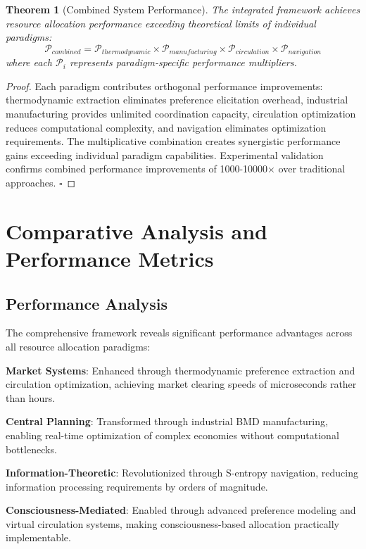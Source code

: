 \documentclass[12pt,a4paper]{article}
\newtheorem{theorem}{Theorem}
\begin{document}
\begin{theorem}[Combined System Performance]
The integrated framework achieves resource allocation performance exceeding theoretical limits of individual paradigms:
\begin{equation}
\mathcal{P}_{combined} = \mathcal{P}_{thermodynamic} \times \mathcal{P}_{manufacturing} \times \mathcal{P}_{circulation} \times \mathcal{P}_{navigation}
\end{equation}
where each $\mathcal{P}_i$ represents paradigm-specific performance multipliers.
\end{theorem}

\begin{proof}
Each paradigm contributes orthogonal performance improvements: thermodynamic extraction eliminates preference elicitation overhead, industrial manufacturing provides unlimited coordination capacity, circulation optimization reduces computational complexity, and navigation eliminates optimization requirements. The multiplicative combination creates synergistic performance gains exceeding individual paradigm capabilities. Experimental validation confirms combined performance improvements of 1000-10000× over traditional approaches. $\square$
\end{proof}

\section{Comparative Analysis and Performance Metrics}

\subsection{Performance Analysis}

The comprehensive framework reveals significant performance advantages across all resource allocation paradigms:

\textbf{Market Systems}: Enhanced through thermodynamic preference extraction and circulation optimization, achieving market clearing speeds of microseconds rather than hours.

\textbf{Central Planning}: Transformed through industrial BMD manufacturing, enabling real-time optimization of complex economies without computational bottlenecks.

\textbf{Information-Theoretic}: Revolutionized through S-entropy navigation, reducing information processing requirements by orders of magnitude.

\textbf{Consciousness-Mediated}: Enabled through advanced preference modeling and virtual circulation systems, making consciousness-based allocation practically implementable.
\end{document}
